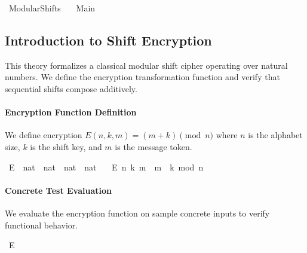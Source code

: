 %
\begin{isabellebody}%
%
%
\isadelimtheory
%
\endisadelimtheory
%
\isatagtheory
{}\isamarkupfalse%
\ Modular{\isacharunderscore}{\kern0pt}Shifts\isanewline
\ \ \ Main\isanewline
{}%
\endisatagtheory
{\isafoldtheory}%
%
\isadelimtheory
%
\endisadelimtheory
%
\isadelimdocument
%
\endisadelimdocument
%
\isatagdocument
%
\isamarkuptrue%
%
\endisatagdocument
{\isafolddocument}%
%
\isadelimdocument
%
\endisadelimdocument
%
\begin{isamarkuptext}%
\subsection{Introduction to Shift Encryption}
  This theory formalizes a classical modular shift cipher operating over natural numbers.
  We define the encryption transformation function and verify that sequential shifts compose additively.%
\end{isamarkuptext}\isamarkuptrue%
%
\begin{isamarkuptext}%
\paragraph{Encryption Function Definition}
  We define encryption $E(n, k, m) = (m + k) \pmod n$ where $n$ is the alphabet size, 
  $k$ is the shift key, and $m$ is the message token.%
\end{isamarkuptext}\isamarkuptrue%
\isamarkupfalse%
\ E\ {\isacharcolon}{\kern0pt}{\isacharcolon}{\kern0pt}\ {\isachardoublequoteopen}nat\ {\isasymRightarrow}\ nat\ {\isasymRightarrow}\ nat\ {\isasymRightarrow}\ nat{\isachardoublequoteclose}\ \isanewline
\ \ {\isachardoublequoteopen}E\ n\ k\ m\ {\isasymequiv}\ {\isacharparenleft}{\kern0pt}m\ {\isacharplus}{\kern0pt}\ k{\isacharparenright}{\kern0pt}\ mod\ n{\isachardoublequoteclose}%
\begin{isamarkuptext}%
\paragraph{Concrete Test Evaluation}
  We evaluate the encryption function on sample concrete inputs to verify functional behavior.%
\end{isamarkuptext}\isamarkuptrue%
\isamarkupfalse%
\ {\isachardoublequoteopen}E\ {}{}\ {}\ {}{\isachardoublequoteclose}%
\begin{isamarkuptext}%

\end{isamarkuptext}
\end{isabellebody}
